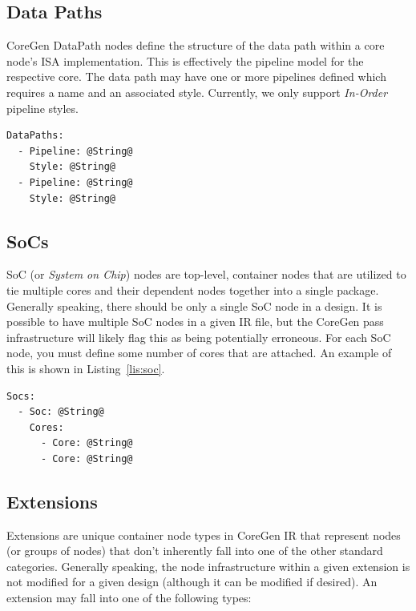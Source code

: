 \documentclass{article}
\begin{document}
\clearpage
\subsection{Data Paths}
\label{sec:DataPathNodes}

CoreGen DataPath nodes define the structure of the data path within a core node's 
ISA implementation.  This is effectively the pipeline model for the respective core.  The data path 
may have one or more pipelines defined which requires a name and an associated style.  Currently, 
we only support \textit{In-Order} pipeline styles.

\vspace{0.125in}
\begin{lstlisting}[frame=single,style=base,caption={Data Path Node Definition},captionpos=b,label={lis:datapath}]
DataPaths:
  - Pipeline: @String@
    Style: @String@
  - Pipeline: @String@
    Style: @String@
\end{lstlisting}



\clearpage
\subsection{SoCs}
\label{sec:SoCNodes}

SoC (or \textit{System on Chip}) nodes are top-level, container nodes that are utilized to tie multiple cores and their dependent 
nodes together into a single package.  Generally speaking, there should be only a single SoC node in a design.  It is possible to 
have multiple SoC nodes in a given IR file, but the CoreGen pass infrastructure will likely flag this as being potentially erroneous.  
For each SoC node, you must define some number of cores that are attached.  An example of this is shown in Listing~\ref{lis:soc}.  

\vspace{0.125in}
\begin{lstlisting}[frame=single,style=base,caption={SoC Node Definition},captionpos=b,label={lis:soc}]
Socs:
  - Soc: @String@
    Cores:
      - Core: @String@
      - Core: @String@
\end{lstlisting}


\clearpage
\subsection{Extensions}
\label{sec:ExtensionNodes}

Extensions are unique container node types in CoreGen IR that represent nodes (or groups of nodes) that don't inherently 
fall into one of the other standard categories.  Generally speaking, the node infrastructure within a given extension 
is not modified for a given design (although it can be modified if desired).  An extension may fall into one of the following types: 
\end{document}
